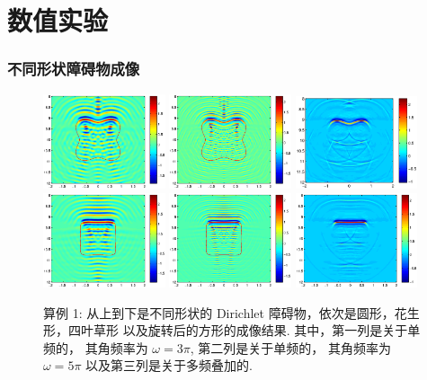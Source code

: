 \documentclass[8pt]{beamer}
\newcommand{\om}{\omega}
\begin{document}
\section{数值实验}
\begin{frame}
\frametitle{不同形状障碍物成像}
\begin{figure}[h]
	\centering
	\includegraphics[width=0.32\textwidth]{./graphic/p_leaf_3pi.eps}
	\includegraphics[width=0.32\textwidth]{./graphic/p_leaf_5pi.eps}
	\includegraphics[width=0.32\textwidth]{./graphic/p_leaf.eps}
	\includegraphics[width=0.32\textwidth]{./graphic/rectangle_3pi.eps}
	\includegraphics[width=0.32\textwidth]{./graphic/rectangle_5pi.eps}
	\includegraphics[width=0.32\textwidth]{./graphic/rectangle.eps}
	\caption{算例 1: 从上到下是不同形状的 Dirichlet 障碍物，依次是圆形，花生形，四叶草形 以及旋转后的方形的成像结果. 其中，第一列是关于单频的， 其角频率为 $\om=3\pi$, 第二列是关于单频的， 其角频率为 $\om=5\pi$ 以及第三列是关于多频叠加的.}
	\label{fig_wgout_ex2}
\end{figure}
\end{frame}
\end{document}
